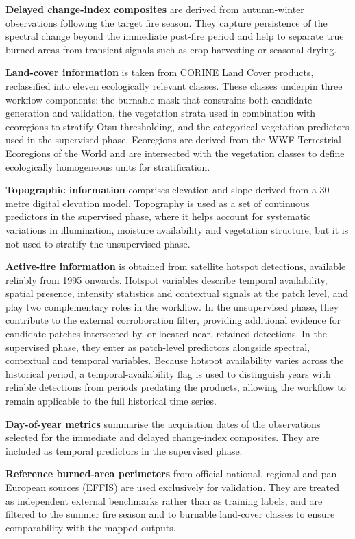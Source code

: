 \documentclass[
  british,
  a4paper,
]{scrbook}
\begin{document}
\textbf{Delayed change-index composites} are derived from autumn-winter
observations following the target fire season. They capture persistence
of the spectral change beyond the immediate post-fire period and help to
separate true burned areas from transient signals such as crop
harvesting or seasonal drying.

\textbf{Land-cover information} is taken from CORINE Land Cover
products, reclassified into eleven ecologically relevant classes. These
classes underpin three workflow components: the burnable mask that
constrains both candidate generation and validation, the vegetation
strata used in combination with ecoregions to stratify Otsu
thresholding, and the categorical vegetation predictors used in the
supervised phase. Ecoregions are derived from the WWF Terrestrial
Ecoregions of the World and are intersected with the vegetation classes
to define ecologically homogeneous units for stratification.

\textbf{Topographic information} comprises elevation and slope derived
from a 30-metre digital elevation model. Topography is used as a set of
continuous predictors in the supervised phase, where it helps account
for systematic variations in illumination, moisture availability and
vegetation structure, but it is not used to stratify the unsupervised
phase.

\textbf{Active-fire information} is obtained from satellite hotspot
detections, available reliably from 1995 onwards. Hotspot variables
describe temporal availability, spatial presence, intensity statistics
and contextual signals at the patch level, and play two complementary
roles in the workflow. In the unsupervised phase, they contribute to the
external corroboration filter, providing additional evidence for
candidate patches intersected by, or located near, retained detections.
In the supervised phase, they enter as patch-level predictors alongside
spectral, contextual and temporal variables. Because hotspot
availability varies across the historical period, a
temporal-availability flag is used to distinguish years with reliable
detections from periods predating the products, allowing the workflow to
remain applicable to the full historical time series.

\textbf{Day-of-year metrics} summarise the acquisition dates of the
observations selected for the immediate and delayed change-index
composites. They are included as temporal predictors in the supervised
phase.

\textbf{Reference burned-area perimeters} from official national,
regional and pan-European sources (EFFIS) are used exclusively for
validation. They are treated as independent external benchmarks rather
than as training labels, and are filtered to the summer fire season and
to burnable land-cover classes to ensure comparability with the mapped
outputs.
\end{document}

